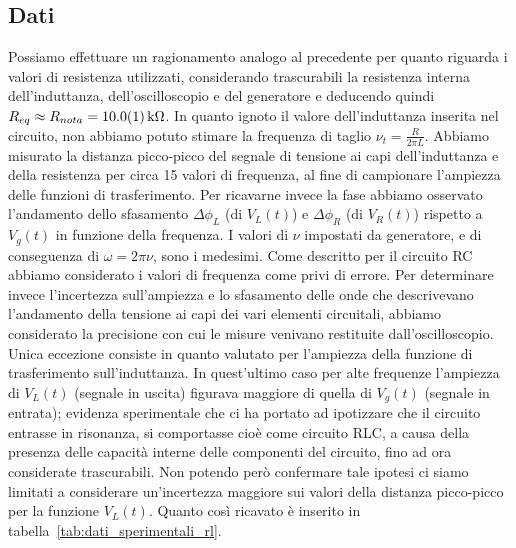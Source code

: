 \documentclass[a4paper]{article}
\begin{document}
\subsection{Dati}
Possiamo effettuare un ragionamento analogo al precedente per quanto riguarda i valori di resistenza utilizzati, considerando trascurabili la resistenza interna dell'induttanza, dell'oscilloscopio e del generatore e deducendo quindi $R_{eq} \approx R_{nota} = \SI{10.0 \pm 0.1}{k\ohm}$. In quanto ignoto il valore dell'induttanza inserita nel circuito, non abbiamo potuto stimare la frequenza di taglio $\nu_t = \frac{R}{2\pi L}$. Abbiamo misurato la distanza picco-picco del segnale di tensione ai capi dell'induttanza e della resistenza per circa 15 valori di frequenza, al fine di campionare l'ampiezza delle funzioni di trasferimento. Per ricavarne invece la fase abbiamo osservato l'andamento dello sfasamento $\Delta\phi_L$ (di $V_L(t)$) e $\Delta\phi_R$ (di $V_R(t)$) rispetto a $V_g(t)$ in funzione della frequenza. I valori di $\nu$ impostati da generatore, e di conseguenza di $\omega = 2\pi \nu$, sono i medesimi. Come descritto per il circuito RC abbiamo considerato i valori di frequenza come privi di errore. Per determinare invece l'incertezza sull'ampiezza e lo sfasamento delle onde che descrivevano l'andamento della tensione ai capi dei vari elementi circuitali, abbiamo considerato la precisione con cui le misure venivano restituite dall'oscilloscopio. Unica eccezione consiste in quanto valutato per l'ampiezza della funzione di trasferimento sull'induttanza. In quest'ultimo caso per alte frequenze l'ampiezza di $V_L(t)$ (segnale in uscita) figurava maggiore di quella di $V_g(t)$ (segnale in entrata); evidenza sperimentale che ci ha portato ad ipotizzare che il circuito entrasse in risonanza, si comportasse cioè come circuito RLC, a causa della presenza delle capacità interne delle componenti del circuito, fino ad ora considerate trascurabili. Non potendo però confermare tale ipotesi ci siamo limitati a considerare un'incertezza maggiore sui valori della distanza picco-picco per la funzione $V_L(t)$. Quanto così ricavato è inserito in tabella~\ref{tab:dati_sperimentali_rl}.
\end{document}
